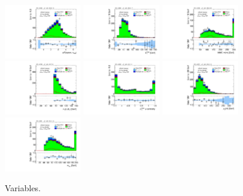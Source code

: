 \begin{figure}[!htpb]
  \includegraphics[width=0.30\textwidth]{figures/analysis/vbf-WlvCR/taulep-dR}
  \includegraphics[width=0.30\textwidth]{figures/analysis/vbf-WlvCR/met-pt-hi}
  \includegraphics[width=0.30\textwidth]{figures/analysis/vbf-WlvCR/mMMC}
  \includegraphics[width=0.30\textwidth]{figures/analysis/vbf-WlvCR/mT-hi}
  \includegraphics[width=0.30\textwidth]{figures/analysis/vbf-WlvCR/met-phi-centrality}
  \includegraphics[width=0.30\textwidth]{figures/analysis/vbf-WlvCR/H-pt-hi}
  \includegraphics[width=0.30\textwidth]{figures/analysis/vbf-WlvCR/mvis}
  \caption{Variables.}
  \label{fig:backgrounds-WlvCR-taus}
\end{figure}

